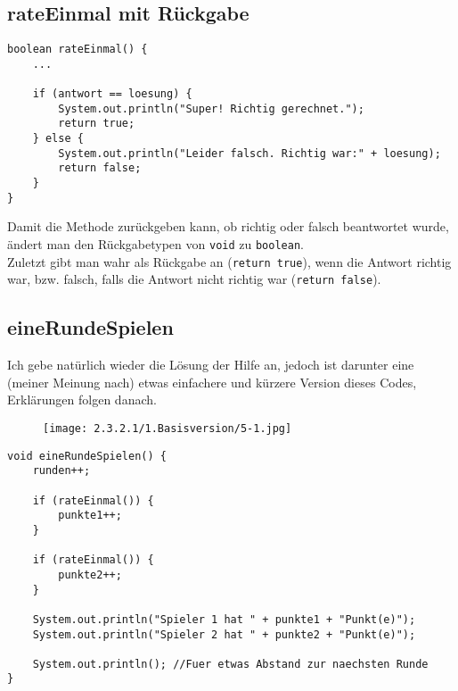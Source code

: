 \documentclass{scrartcl}   %
\begin{document}
\subsection{rateEinmal mit Rückgabe}

\begin{lstlisting}
boolean rateEinmal() {
    ...
    
    if (antwort == loesung) {
        System.out.println("Super! Richtig gerechnet.");
        return true;
    } else {
        System.out.println("Leider falsch. Richtig war:" + loesung);
        return false;
    }
}
\end{lstlisting}

\newpage

Damit die Methode zurückgeben kann, ob richtig oder falsch beantwortet wurde, ändert man den Rückgabetypen von \texttt{void} zu \texttt{boolean}.\\
Zuletzt gibt man \glqq wahr\grqq{} als Rückgabe an (\texttt{return true}), wenn die Antwort richtig war, bzw. \glqq falsch\grqq{}, falls die Antwort nicht richtig war (\texttt{return false}).

\subsection{eineRundeSpielen}

Ich gebe natürlich wieder die Lösung der Hilfe an, jedoch ist darunter eine (meiner Meinung nach) etwas einfachere und kürzere Version dieses Codes, Erklärungen folgen danach.\\

\begin{figure}[ht]
	\centering
	\texttt{[image: 2.3.2.1/1.Basisversion/5-1.jpg]}
\end{figure}

\newpage

\begin{lstlisting}
void eineRundeSpielen() {
    runden++;
    
    if (rateEinmal()) {
        punkte1++;
    }
    
    if (rateEinmal()) {
        punkte2++;
    }
    
    System.out.println("Spieler 1 hat " + punkte1 + "Punkt(e)");
    System.out.println("Spieler 2 hat " + punkte2 + "Punkt(e)");
    
    System.out.println(); //Fuer etwas Abstand zur naechsten Runde
}
\end{lstlisting}
\end{document}
